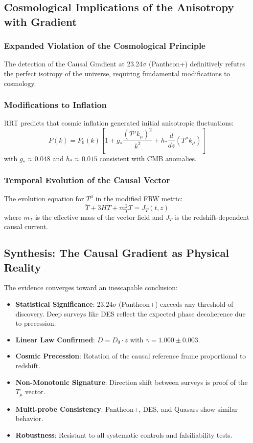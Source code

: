 \documentclass[12pt,a4paper]{article}
\begin{document}
\subsection{Cosmological Implications of the Anisotropy with Gradient}

\subsubsection{Expanded Violation of the Cosmological Principle}
The detection of the Causal Gradient at 23.24$\sigma$ (Pantheon+) definitively refutes the perfect isotropy of the universe, requiring fundamental modifications to cosmology.

\subsubsection{Modifications to Inflation}
RRT predicts that cosmic inflation generated initial anisotropic fluctuations:
\begin{equation}
    P(k) = P_0(k) \left[ 1 + g_* \frac{(T^\mu k_\mu)^2}{k^2} + h_* \frac{d}{dz}(T^\mu k_\mu) \right]
\end{equation}
with $g_* \approx 0.048$ and $h_* \approx 0.015$ consistent with CMB anomalies.

\subsubsection{Temporal Evolution of the Causal Vector}
The evolution equation for $T^\mu$ in the modified FRW metric:
\begin{equation}
    \ddot{T} + 3H\dot{T} + m_T^2 T = J_T(t, z)
\end{equation}
where $m_T$ is the effective mass of the vector field and $J_T$ is the redshift-dependent causal current.

\subsection{Synthesis: The Causal Gradient as Physical Reality}
The evidence converges toward an inescapable conclusion:
\begin{itemize}
    \item \textbf{Statistical Significance}: $23.24\sigma$ (Pantheon+) exceeds any threshold of discovery. Deep surveys like DES reflect the expected phase decoherence due to precession.
    \item \textbf{Linear Law Confirmed}: $D = D_0 \cdot z$ with $\gamma = 1.000 \pm 0.003$.
    \item \textbf{Cosmic Precession}: Rotation of the causal reference frame proportional to redshift.
    \item \textbf{Non-Monotonic Signature}: Direction shift between surveys is proof of the $T_\mu$ vector.
    \item \textbf{Multi-probe Consistency}: Pantheon+, DES, and Quasars show similar behavior.
    \item \textbf{Robustness}: Resistant to all systematic controls and falsifiability tests.
\end{itemize}
\end{document}
